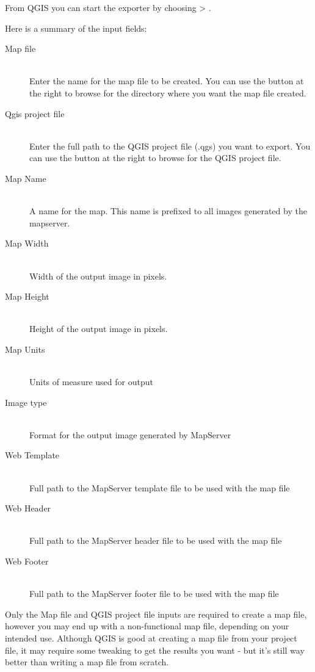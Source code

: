 From QGIS you can start the exporter by choosing  > . 

Here is a summary of the input fields:

\begin{description}
\item [Map file] \mbox{}\\
Enter the name for the map file to be created. You can use the button at the right to browse for the directory where you want the map file created. 

\item [Qgis project file] \mbox{}\\
Enter the full path to the QGIS project file (.qgs) you want to export. You can use the button at the right to browse for the QGIS project file.
\item [Map Name] \mbox{}\\
A name for the map. This name is prefixed to all images generated by the mapserver.
\item [Map Width] \mbox{}\\
Width of the output image in pixels.

\item [Map Height] \mbox{}\\
Height of the output image in pixels.
\item [Map Units] \mbox{}\\
Units of measure used for output
\item [Image type] \mbox{}\\
Format for the output image generated by MapServer
\item [Web Template] \mbox{}\\
Full path to the MapServer template file to be used with the map file
\item [Web Header] \mbox{}\\
Full path to the MapServer header file to be used with the map file
\item [Web Footer] \mbox{}\\
Full path to the MapServer footer file to be used with the map file
\end{description}

Only the Map file and QGIS project file inputs are required to create a
map file, however you may end up with a non-functional map file, depending
on your intended use. Although QGIS is good at creating a map file from
your project file, it may require some tweaking to get the results you
want - but it's still way better than writing a map file from scratch.  

